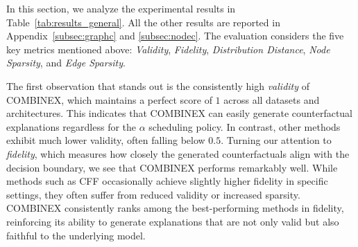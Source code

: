 
In this section, we analyze the experimental results in Table~\ref{tab:results_general}. All the other results are reported in Appendix~\ref{subsec:graphc} and \ref{subsec:nodec}.
The evaluation considers the five key metrics mentioned above: \textit{Validity}, \textit{Fidelity}, \textit{Distribution Distance}, \textit{Node Sparsity}, and \textit{Edge Sparsity}. 


The first observation that stands out is the consistently high \textit{validity} of COMBINEX, which maintains a perfect score of $1$ across all datasets and architectures. This indicates that COMBINEX can easily generate counterfactual explanations regardless for the $\alpha$ scheduling policy. In contrast, other methods exhibit much lower validity, often falling below $0.5$. Turning our attention to \textit{fidelity}, which measures how closely the generated counterfactuals align with the decision boundary, we see that COMBINEX performs remarkably well. While methods such as CFF occasionally achieve slightly higher fidelity in specific settings, they often suffer from reduced validity or increased sparsity. COMBINEX consistently ranks among the best-performing methods in fidelity, reinforcing its ability to generate explanations that are not only valid but also faithful to the underlying model.


